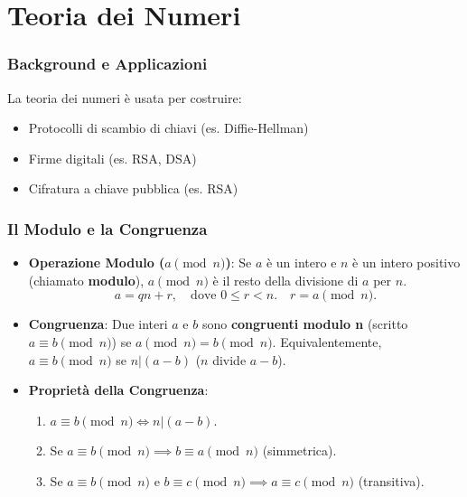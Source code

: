 \documentclass{article}
\begin{document}
\begin{itemize}
\begin{center}
    \end{center}
\end{itemize}

\part{Teoria dei Numeri}

\section{Background e Applicazioni}
La teoria dei numeri è usata per costruire:
\begin{itemize}
    \item Protocolli di scambio di chiavi (es. Diffie-Hellman)
    \item Firme digitali (es. RSA, DSA)
    \item Cifratura a chiave pubblica (es. RSA)
\end{itemize}

\section{Il Modulo e la Congruenza}
\begin{itemize}
    \item \textbf{Operazione Modulo ($a \pmod n$)}: Se $a$ è un intero e $n$ è un intero positivo (chiamato \textbf{modulo}), $a \pmod n$ è il resto della divisione di $a$ per $n$.
    \[ a = qn + r, \quad \text{dove } 0 \le r < n. \quad r = a \pmod n. \]
    \item \textbf{Congruenza}: Due interi $a$ e $b$ sono \textbf{congruenti modulo n} (scritto $a \equiv b \pmod n$) se $a \pmod n = b \pmod n$.
    Equivalentemente, $a \equiv b \pmod n$ se $n | (a-b)$ ($n$ divide $a-b$).
    \item \textbf{Proprietà della Congruenza}:
    \begin{enumerate}
        \item $a \equiv b \pmod n \iff n | (a-b)$.
        \item Se $a \equiv b \pmod n \implies b \equiv a \pmod n$ (simmetrica).
        \item Se $a \equiv b \pmod n$ e $b \equiv c \pmod n \implies a \equiv c \pmod n$ (transitiva).
    \end{enumerate}
\end{itemize}
\end{document}
